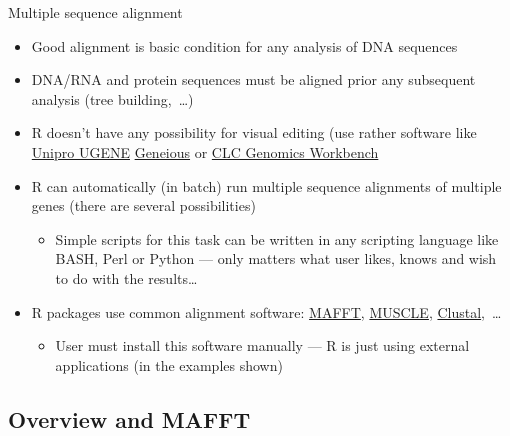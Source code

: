 \documentclass[compress, ucs, xelatex, 11pt, xcolor=svgnames, aspectratio=169,
	hyperref={
		bookmarks=true,
		unicode=true,
		colorlinks=true,
		pdftitle={Molecular data in R},
		plainpages=false,
		pdfauthor={Vojtech Zeisek},
		pdfsubject={Course about phylogeny and evolution in R},
		pdfcreator={XeLaTeX},
		pdfkeywords={R, evolution, phylogeny, molecular data},
		linkcolor=Crimson, %
		anchorcolor=Magenta, %
		citecolor=Magenta, %
		filecolor=Magenta, %
		menucolor=Magenta, %
		urlcolor=DodgerBlue, %
		pdftex},
	url={hyphens, lowtilde} %
	]{beamer}
\begin{document}
\begin{frame}{Multiple sequence alignment}
	\label{alignment}
	\begin{itemize}
		\item Good alignment is basic condition for any analysis of DNA sequences
		\item DNA/RNA and protein sequences must be aligned prior any subsequent analysis (tree building,~\ldots)
		\item R doesn't have any possibility for visual editing (use rather software like \href{http://ugene.net/}{Unipro UGENE} \href{https://www.geneious.com/}{Geneious} or \href{https://digitalinsights.qiagen.com/products-overview/analysis-and-visualization/qiagen-clc-genomics-workbench/}{CLC Genomics Workbench}
		\item R can automatically (in batch) run multiple sequence alignments of multiple genes (there are several possibilities)
		\begin{itemize}
			\item Simple scripts for this task can be written in any scripting language like BASH, Perl or Python --- only matters what user likes, knows and wish to do with the results\ldots
		\end{itemize}
		\item R packages use common alignment software: \href{https://mafft.cbrc.jp/alignment/software/}{MAFFT}, \href{https://www.drive5.com/muscle/}{MUSCLE}, \href{http://clustal.org/}{Clustal},~\ldots
		\begin{itemize}
			\item User must install this software manually --- R is just using external applications (in the examples shown)
		\end{itemize}
	\end{itemize}
\end{frame}

\subsection{Overview and MAFFT}
\end{document}
